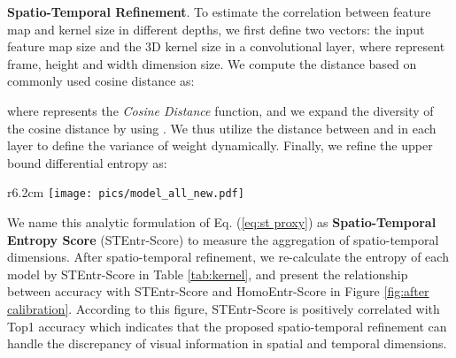 \documentclass{article} \usepackage{iclr2023_conference,times}
\begin{document}
\noindent\textbf{Spatio-Temporal Refinement}.
To estimate the correlation between feature map and kernel size in different depths, we first define two vectors: the input feature map size  and the 3D kernel size  in a convolutional layer, where  represent frame, height and width dimension size.
We compute the distance  based on commonly used cosine distance as:

where  represents the \textit{Cosine Distance} function, and we expand the diversity of the cosine distance by using .
We thus utilize the distance  between  and  in each layer to define the variance of weight dynamically.
Finally, we refine the upper bound differential entropy as:

\begin{wrapfigure}{r}{6.2cm}
    \centering
    \texttt{[image: pics/model\_all\_new.pdf]}
\caption{Top-1 accuracy vs. STEntr-Score and HomoEntr-Score.}
    \label{fig:after calibration}
\end{wrapfigure}
We name this analytic formulation of Eq. (\ref{eq:st proxy}) as \textbf{Spatio-Temporal Entropy Score} (STEntr-Score) to measure the aggregation of spatio-temporal dimensions.
After spatio-temporal refinement, we re-calculate the entropy of each model by STEntr-Score in Table \ref{tab:kernel}, and present the relationship between accuracy with STEntr-Score and HomoEntr-Score in Figure \ref{fig:after calibration}.
According to this figure, STEntr-Score is positively correlated with Top1 accuracy which indicates that the proposed spatio-temporal refinement can handle the discrepancy of visual information in spatial and temporal dimensions.
\end{document}
